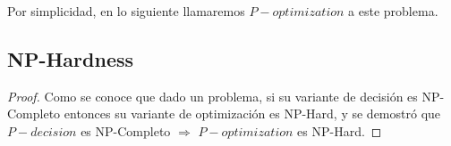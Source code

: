 Por simplicidad, en lo siguiente llamaremos $P-optimization$ a este problema. 

\subsection{NP-Hardness}

\begin{proof}
    Como se conoce que dado un problema, si su variante de decisión es NP-Completo entonces su variante de optimización es NP-Hard, y se demostró que $P-decision$ es NP-Completo $\Rightarrow$ $P-optimization$ es NP-Hard.
\end{proof}


% 
